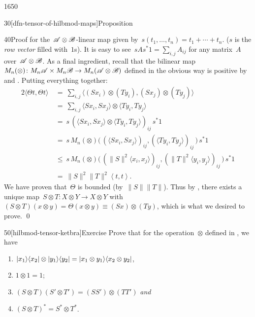 \begin{parsec}{1650}
\begin{point}{30}[dfn-tensor-of-hilbmod-maps]{Proposition}
\begin{point}{40}{Proof}
    for the~$\mathscr{A} \otimes \mathscr{B}$-linear map
    given by~$s(t_1, \ldots, t_n) = t_1 + \cdots + t_n$.
    ($s$ is the \emph{row vector} filled with~$1$s).
It is easy to see~$s A s^* 1= \sum_{i,j} A_{ij}$
    for any matrix~$A$ over~$\mathscr{A} \otimes \mathscr{B}$.
As a final ingredient,
    recall that the
    bilinear map~$M_n(\otimes) \colon M_n \mathscr{A} \times M_n \mathscr{B} \to
                M_n( \mathscr{A} \otimes \mathscr{B})$
        defined in the obvious way
        is positive by  and .
    Putting everything together:
\begin{alignat*}{2}
    \langle \Theta t, \Theta t \rangle
        & \ = \ \sum_{i,j} \langle 
    (Sx_i) \otimes (Ty_i),
    (Sx_j) \otimes (Ty_j)
            \rangle  \\
        & \ = \ \sum_{i,j} 
    \langle Sx_i, S x_j \rangle
    \otimes \langle Ty_i, T y_j \rangle \\
    & \ = \ 
    s \,
    \left( 
    \langle Sx_i, S x_j \rangle
    \otimes \langle Ty_i, T y_j \rangle
\right)_{ij}  \,
     s^*1 \\
    & \ = \ 
     s \,
M_n(\otimes) \bigl(\,
    \left( 
    \langle Sx_i, S x_j \rangle \right)_{ij},
\left( \langle Ty_i, T y_j \rangle \right)_{ij} \,\bigr) 
\, s^*1 \\
    & \ \leq \ 
s \,
M_n(\otimes) \bigl(\,
    ( 
    \|S\|^2 \langle x_i,  x_j \rangle )_{ij},
(\|T\|^2 \langle y_i,  y_j \rangle )_{ij} \,\bigr) 
\, s^*1 \\
        & \ = \
    \|S\|^2\|T\|^2 \left<t,t\right>.
\end{alignat*}
We have proven that~$\Theta$ is bounded (by~$\|S\|\|T\|$).
Thus by ,
    there exists a unique map~$S \otimes T \colon X\otimes Y \to X\otimes Y$
    with~$(S \otimes T) (x \otimes y) = \Theta(x \otimes y)
        \equiv (S x) \otimes (Ty)$,
        which is what we desired to prove. \qed
\end{point}
\end{point}
\begin{point}{50}[hilbmod-tensor-ketbra]{Exercise}%
Prove that for the
operation~$\otimes$ defined in , we have
\begin{enumerate}
    \item $\left|x_1\right>\!\left<x_2\right| \otimes \left|y_1\right>\!\left<y_2\right|
            = \left|x_1\otimes y_1\right>\!\left<x_2\otimes y_2\right|$,
        \item $1 \otimes 1 = 1$;
    \item $(S \otimes T) (S' \otimes T') = (SS' ) \otimes (TT')$
                \emph{and}
            \item $(S \otimes T)^* = S^* \otimes T^*$.


\end{enumerate}
\end{point}
\end{parsec}
